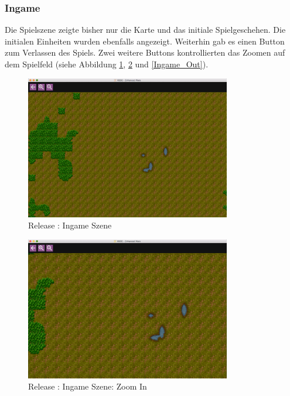 \documentclass[12pt, titlepage]{scrartcl}
\newcommand{\RN}[1]{%
	\textup{\uppercase\expandafter{\romannumeral#1}}%
}
\begin{document}
	        \subsubsection{Ingame}
	            Die Spielszene zeigte bisher nur die Karte und das initiale Spielgeschehen. Die initialen Einheiten wurden ebenfalls angezeigt. Weiterhin gab es einen Button zum Verlassen des Spiels. Zwei weitere Buttons kontrollierten das Zoomen auf dem Spielfeld (siehe Abbildung \ref{Ingame}, \ref{Ingame_In} und \ref{Ingame_Out}). \\
	            \begin{figure}[H] 
    				\centering
    				\includegraphics[width=0.8\textwidth]{images/old_state/ingame/Ingame.png}
    				\caption{Release \RN{2}: Ingame Szene}
    				\label{Ingame}
			    \end{figure}
			    \begin{figure}[H] 
    				\centering
    				\includegraphics[width=0.8\textwidth]{images/old_state/ingame/ZoomIn.png}
    				\caption{Release \RN{2}: Ingame Szene: Zoom In}
    				\label{Ingame_In}
			    \end{figure}
\end{document}
